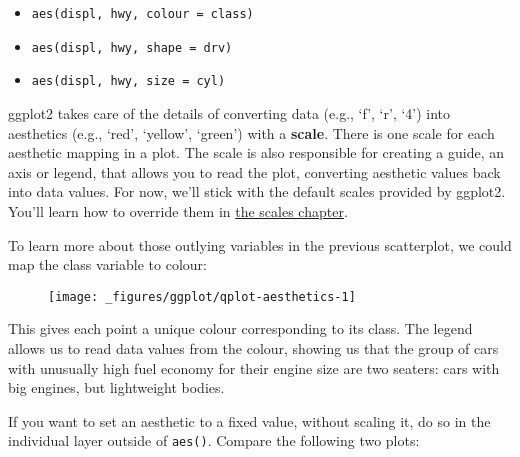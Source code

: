 \begin{itemize}
\tightlist
\item
  \texttt{aes(displ,\ hwy,\ colour\ =\ class)}
\item
  \texttt{aes(displ,\ hwy,\ shape\ =\ drv)}
\item
  \texttt{aes(displ,\ hwy,\ size\ =\ cyl)}
\end{itemize}

ggplot2 takes care of the details of converting data (e.g., `f', `r',
`4') into aesthetics (e.g., `red', `yellow', `green') with a
\textbf{scale}. There is one scale for each aesthetic mapping in a plot.
The scale is also responsible for creating a guide, an axis or legend,
that allows you to read the plot, converting aesthetic values back into
data values. For now, we'll stick with the default scales provided by
ggplot2. You'll learn how to override them in
\protect\hyperlink{cha:scales}{the scales chapter}.

To learn more about those outlying variables in the previous
scatterplot, we could map the class variable to colour:

\begin{Shaded}
\begin{Highlighting}[]
 \StringTok{ }
\StringTok{  }\NormalTok{()}
\end{Highlighting}
\end{Shaded}

\begin{figure}[H]
  \centering
  \texttt{[image: \_figures/ggplot/qplot-aesthetics-1]}
\end{figure}

This gives each point a unique colour corresponding to its class. The
legend allows us to read data values from the colour, showing us that
the group of cars with unusually high fuel economy for their engine size
are two seaters: cars with big engines, but lightweight bodies.

If you want to set an aesthetic to a fixed value, without scaling it, do
so in the individual layer outside of \texttt{aes()}. Compare the
following two plots: 

\begin{Shaded}
\begin{Highlighting}[]
\StringTok{ }\NormalTok{(}\NormalTok{(} \NormalTok{))}
\StringTok{ }\NormalTok{(} \NormalTok{)}
\end{Highlighting}
\end{Shaded}


